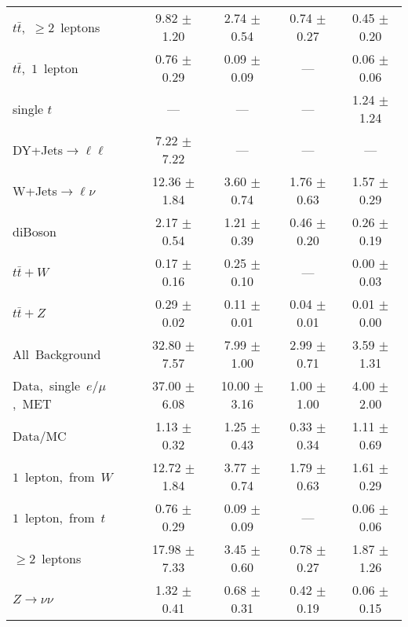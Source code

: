 \documentclass{article}
\begin{document}
\begin{longtable}{|l|c|c|c|c|}
$t\bar{t}$,~$\ge2$~leptons & 9.82 $\pm$ 1.20  & 2.74 $\pm$ 0.54  & 0.74 $\pm$ 0.27  & 0.45 $\pm$ 0.20 \\* 
$t\bar{t}$,~$1$~lepton & 0.76 $\pm$ 0.29  & 0.09 $\pm$ 0.09  & ---  & 0.06 $\pm$ 0.06 \\* 
single $t$  & ---  & ---  & ---  & 1.24 $\pm$ 1.24 \\* 
DY+Jets$\rightarrow\ell\ell$  & 7.22 $\pm$ 7.22  & ---  & ---  & --- \\* 
W+Jets$\rightarrow\ell\nu$  & 12.36 $\pm$ 1.84  & 3.60 $\pm$ 0.74  & 1.76 $\pm$ 0.63  & 1.57 $\pm$ 0.29 \\* 
diBoson  & 2.17 $\pm$ 0.54  & 1.21 $\pm$ 0.39  & 0.46 $\pm$ 0.20  & 0.26 $\pm$ 0.19 \\* 
$t\bar{t}+W$  & 0.17 $\pm$ 0.16  & 0.25 $\pm$ 0.10  & ---  & 0.00 $\pm$ 0.03 \\* 
$t\bar{t}+Z$  & 0.29 $\pm$ 0.02  & 0.11 $\pm$ 0.01  & 0.04 $\pm$ 0.01  & 0.01 $\pm$ 0.00 \\* 
\hline \hline 
All~Background  & 32.80 $\pm$ 7.57  & 7.99 $\pm$ 1.00  & 2.99 $\pm$ 0.71  & 3.59 $\pm$ 1.31 \\* 
Data,~single~$e/\mu$,~MET  & 37.00 $\pm$ 6.08  & 10.00 $\pm$ 3.16  & 1.00 $\pm$ 1.00  & 4.00 $\pm$ 2.00 \\* 
Data/MC  & 1.13 $\pm$ 0.32  & 1.25 $\pm$ 0.43  & 0.33 $\pm$ 0.34  & 1.11 $\pm$ 0.69 \\* 
\hline \hline 
$1$~lepton,~from~$W$  & 12.72 $\pm$ 1.84  & 3.77 $\pm$ 0.74  & 1.79 $\pm$ 0.63  & 1.61 $\pm$ 0.29 \\* 
$1$~lepton,~from~$t$  & 0.76 $\pm$ 0.29  & 0.09 $\pm$ 0.09  & ---  & 0.06 $\pm$ 0.06 \\* 
$\ge2$~leptons  & 17.98 $\pm$ 7.33  & 3.45 $\pm$ 0.60  & 0.78 $\pm$ 0.27  & 1.87 $\pm$ 1.26 \\* 
$Z\rightarrow\nu\nu$  & 1.32 $\pm$ 0.41  & 0.68 $\pm$ 0.31  & 0.42 $\pm$ 0.19  & 0.06 $\pm$ 0.15 \\* 
\hline 
\end{longtable} 

 
 
 
 
\pagebreak 

 
 
 
 
\end{document}
